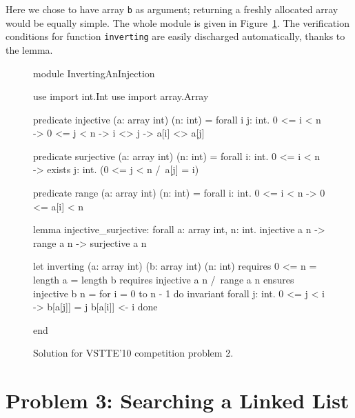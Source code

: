 Here we chose to have array \texttt{b} as argument; returning a
freshly allocated array would be equally simple.
The whole module is given in Figure~\ref{fig:Inverting}.
The verification conditions for function \texttt{inverting} are easily
discharged automatically, thanks to the lemma.
\begin{figure}
  \centering
\begin{whycode}
module InvertingAnInjection

  use import int.Int
  use import array.Array

  predicate injective (a: array int) (n: int) =
    forall i j: int. 0 <= i < n -> 0 <= j < n -> i <> j -> a[i] <> a[j]

  predicate surjective (a: array int) (n: int) =
    forall i: int. 0 <= i < n -> exists j: int. (0 <= j < n /\ a[j] = i)

  predicate range (a: array int) (n: int) =
    forall i: int. 0 <= i < n -> 0 <= a[i] < n

  lemma injective_surjective:
    forall a: array int, n: int.
      injective a n -> range a n -> surjective a n

  let inverting (a: array int) (b: array int) (n: int)
    requires { 0 <= n = length a = length b }
    requires { injective a n /\ range a n }
    ensures  { injective b n }
  = for i = 0 to n - 1 do
      invariant { forall j: int. 0 <= j < i -> b[a[j]] = j }
      b[a[i]] <- i
    done

end
\end{whycode}
\vspace*{-1em}%
  \caption{Solution for VSTTE'10 competition problem 2.}
  \label{fig:Inverting}
\end{figure}

\section{Problem 3: Searching a Linked List}

